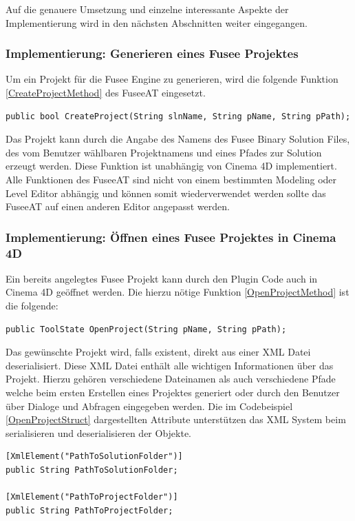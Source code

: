 \documentclass[pagesize, paper=a4, fontsize=12pt, titlepage=true, headings=small, headnosepline, abstractoff, liststotoc, nochapterprefix, plainheadsepline, twoside]{scrreprt}
\begin{document}
Auf die genauere Umsetzung und einzelne interessante Aspekte der Implementierung wird in den nächsten Abschnitten weiter eingegangen.

\subsubsection{Implementierung: Generieren eines Fusee Projektes}
Um ein Projekt für die Fusee Engine zu generieren, wird die folgende Funktion \ref{CreateProjectMethod} des FuseeAT eingesetzt. 
\begin{lstlisting}[label=CreateProjectMethod, caption=Funktion zum Generieren eines neuen Projekts in der Binary Version der Fusee Engine.]
	public bool CreateProject(String slnName, String pName, String pPath);
\end{lstlisting}
Das Projekt kann durch die Angabe des Namens des Fusee Binary Solution Files, des vom Benutzer wählbaren Projektnamens und eines Pfades zur Solution erzeugt werden. Diese Funktion ist unabhängig von Cinema 4D implementiert. Alle Funktionen des FuseeAT sind nicht von einem bestimmten Modeling oder Level Editor abhängig und können somit wiederverwendet werden sollte das FuseeAT auf einen anderen Editor angepasst werden.

\subsubsection{Implementierung: Öffnen eines Fusee Projektes in Cinema 4D}
Ein bereits angelegtes Fusee Projekt kann durch den Plugin Code auch in Cinema 4D geöffnet werden. Die hierzu nötige Funktion \ref{OpenProjectMethod} ist die folgende:
\begin{lstlisting}[label=OpenProjectMethod, caption=Funktion zum öffnen eines neuen Projekts in der Binary Version der Fusee Engine.]
	public ToolState OpenProject(String pName, String pPath);
\end{lstlisting}
Das gewünschte Projekt wird, falls existent, direkt aus einer XML Datei deserialisiert. Diese XML Datei enthält alle wichtigen Informationen über das Projekt. Hierzu gehören verschiedene Dateinamen als auch verschiedene Pfade welche beim ersten Erstellen eines Projektes generiert oder durch den Benutzer über Dialoge und Abfragen eingegeben werden. Die im Codebeispiel \ref{OpenProjectStruct} dargestellten Attribute unterstützen das XML System beim serialisieren und deserialisieren der Objekte.

\begin{lstlisting}[label=OpenProjectStruct, caption=Teil des Structs zum Serialisieren des Fusee Projektes aus Cinem a 4D. Die Serialisierung speichert das Projekt auf der Festplatte als lesbare XML Datei.]
[XmlElement("PathToSolutionFolder")]
public String PathToSolutionFolder;

[XmlElement("PathToProjectFolder")]
public String PathToProjectFolder;
\end{lstlisting}
\end{document}
